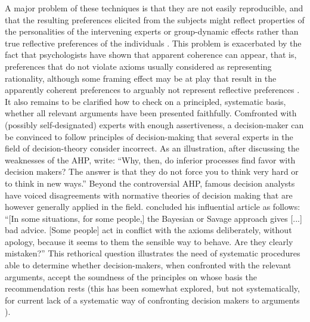 \documentclass[version=last, pagesize, twoside=off, bibliography=totoc, DIV=calc, fontsize=12pt, a4paper, french, english]{scrartcl}
\begin{document}
A major problem of these techniques is that they are not easily reproducible, and that the resulting preferences elicited from the subjects might reflect properties of the personalities of the intervening experts or group-dynamic effects rather than true reflective preferences of the individuals . This problem is exacerbated by the fact that psychologists have shown that apparent coherence can appear, that is, preferences that do not violate axioms usually considered as representing rationality, although some framing effect may be at play that result in the apparently coherent preferences to arguably not represent reflective preferences \citep{ariely_predictably_2010}. It also remains to be clarified how to check on a principled, systematic basis, whether all relevant arguments have been presented faithfully. Comfronted with (possibly self-designated) experts with enough assertiveness, a decision-maker can be convinced to follow principles of decision-making that several experts in the field of decision-theory consider incorrect. As an illustration, after discussing the weaknesses of the \ac{AHP}, \citet[p.\ 53]{howard_foundations_2007} write: “Why, then, do inferior processes find favor with decision makers? The answer is that they do not force you to think very hard or to think in new ways.”
Beyond the controversial \ac{AHP}, famous decision analysts have voiced disagreements with normative theories of decision making \citep{ellsberg_risk_1961, allais_so-called_1979} that are however generally applied in the field. 
 concluded his influential article as follows: “[In some situations, for some people,] the Bayesian or Savage approach gives [...] bad advice. [Some people] act in conflict with the axioms deliberately, without apology, because it seems to them the sensible way to behave. Are they clearly mistaken?” 
This rethorical question illustrates the need of systematic procedures able to determine whether decision-makers, when confronted with the relevant arguments, accept the soundness of the principles on whose basis the recommendation rests (this has been somewhat explored, but not systematically, for current lack of a systematic way of confronting decision makers to arguments \citep{slovic_who_1974, stanovich_discrepancies_1999}). 
\end{document}
